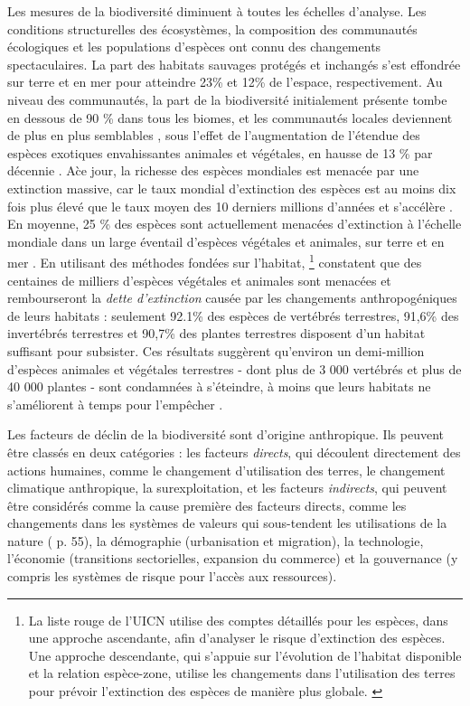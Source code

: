 Les mesures de la biodiversité diminuent à toutes les échelles d'analyse. Les conditions structurelles des écosystèmes, la composition des communautés écologiques et les populations d'espèces ont connu des changements spectaculaires.
La part des habitats sauvages protégés et inchangés s'est effondrée sur terre et en mer \citep{watson_2016_catastrophic, jones_2018_location} pour atteindre 23\% et 12\% de l'espace, respectivement. Au niveau des communautés, la part de la biodiversité initialement présente tombe en dessous de 90 \% dans tous les biomes, \citep{Hill311787} et les communautés locales deviennent de plus en plus semblables \citep{mckinney_1999_biotic}, sous l'effet de l'augmentation de l'étendue des espèces exotiques envahissantes animales et végétales, en hausse de 13 \% par décennie \citep{seebens_no_2017}. A\` ce jour, la richesse des espèces mondiales est menacée par une extinction massive, car le taux mondial d'extinction des espèces est au moins dix fois plus élevé que le taux moyen des 10 derniers millions d'années et s'accélère \citep{barnosky_has_2011, ceballos_accelerated_2015}. En moyenne, 25 \% des espèces sont actuellement menacées d'extinction à l'échelle mondiale dans un large éventail d'espèces végétales et animales, sur terre et en mer \citep{IUCN_redlist_2024}. En utilisant des méthodes fondées sur l'habitat, \cite{Hoskins309377}\footnote{La liste rouge de l'UICN utilise des comptes détaillés pour les espèces, dans une approche ascendante, afin d'analyser le risque d'extinction des espèces. Une approche descendante, qui s'appuie sur l'évolution de l'habitat disponible et la relation espèce-zone, utilise les changements dans l'utilisation des terres pour prévoir l'extinction des espèces de manière plus globale. \citep{Diamond1972BiogeographicKE}} constatent que des centaines de milliers d'espèces végétales et animales sont menacées et rembourseront la \textit{dette d'extinction} causée par les changements anthropogéniques de leurs habitats : seulement 92.1\% des espèces de vertébrés terrestres, 91,6\% des invertébrés terrestres et 90,7\% des plantes terrestres disposent d'un habitat suffisant pour subsister. Ces résultats suggèrent qu'environ un demi-million d'espèces animales et végétales terrestres - dont plus de 3 000 vertébrés et plus de 40 000 plantes - sont condamnées à s'éteindre, à moins que leurs habitats ne s'améliorent à temps pour l'empêcher \citep{ipbes_2022_6417333}.

Les facteurs de déclin de la biodiversité sont d'origine anthropique. Ils peuvent être classés en deux catégories : les facteurs \textit{directs}, qui découlent directement des actions humaines, comme le changement d'utilisation des terres, le changement climatique anthropique, la surexploitation, et les facteurs \textit{indirects}, qui peuvent être considérés comme la cause première des facteurs directs, comme les changements dans les systèmes de valeurs qui sous-tendent les utilisations de la nature (\cite{ipbes_2022_6417333} p. 55), la démographie (urbanisation et migration), la technologie, l'économie (transitions sectorielles, expansion du commerce) et la gouvernance (y compris les systèmes de risque pour l'accès aux ressources).

